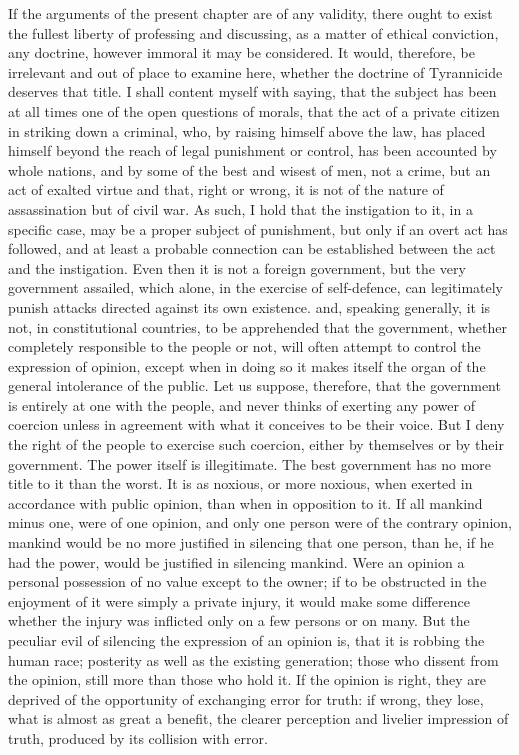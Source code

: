 \documentclass[12pt]{report}
\begin{document}
{If the arguments of the present chapter are of any validity, there ought to exist the fullest liberty of professing and discussing, as a matter of ethical conviction, any doctrine, however immoral it may be considered. It would, therefore, be irrelevant and out of place to examine here, whether the doctrine of Tyrannicide deserves that title. I shall content myself with saying, that the subject has been at all times one of the open questions of morals, that the act of a private citizen in striking down a criminal, who, by raising himself above the law, has placed himself beyond the reach of legal punishment or control, has been accounted by whole nations, and by some of the best and wisest of men, not a crime, but an act of exalted virtue and that, right or wrong, it is not of the nature of assassination but of civil war. As such, I hold that the instigation to it, in a specific case, may be a proper subject of punishment, but only if an overt act has followed, and at least a probable connection can be established between the act and the instigation. Even then it is not a foreign government, but the very government assailed, which alone, in the exercise of self-defence, can legitimately punish attacks directed against its own existence.} and, speaking generally, it is not, in constitutional countries, to be apprehended that the government, whether completely responsible to the people or not, will often attempt to control the expression of opinion, except when in doing so it makes itself the organ of the general intolerance of the public. Let us suppose, therefore, that the government is entirely at one with the people, and never thinks of exerting any power of coercion unless in agreement with what it conceives to be their voice. But I deny the right of the people to exercise such coercion, either by themselves or by their government. The power itself is illegitimate. The best government has no more title to it than the worst. It is as noxious, or more noxious, when exerted in accordance with public opinion, than when in opposition to it. If all mankind minus one, were of one opinion, and only one person were of the contrary opinion, mankind would be no more justified in silencing that one person, than he, if he had the power, would be justified in silencing mankind. Were an opinion a personal possession of no value except to the owner; if to be obstructed in the enjoyment of it were simply a private injury, it would make some difference whether the injury was inflicted only on a few persons or on many. But the peculiar evil of silencing the expression of an opinion is, that it is robbing the human race; posterity as well as the existing generation; those who dissent from the opinion, still more than those who hold it. If the opinion is right, they are deprived of the opportunity of exchanging error for truth: if wrong, they lose, what is almost as great a benefit, the clearer perception and livelier impression of truth, produced by its collision with error.
\end{document}
